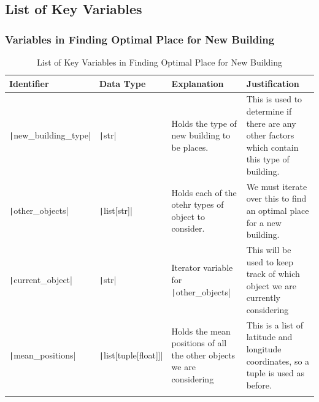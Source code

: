 \documentclass[12pt]{report}
\newcommand{\pil}[1]{\protect\texttt|#1|}
\begin{document}
\subsection{List of Key Variables}
\subsubsection{Variables in Finding Optimal Place for New Building}
\begin{center}
\begin{longtable}{ | m{3cm} | m{4cm}| m{4cm} | m{4cm} |} 
    \hline
    \textbf{Identifier} & \textbf{Data Type} & \textbf{Explanation}  & \textbf{Justification} \\ 
    \hline
    \pil{new_building_type} & \pil{str} & Holds the type of new building to be places. & This is used to determine if there are any other factors which contain this type of building. \\ 
    \hline
    \pil{other_objects} & \pil{list[str]} & Holds each of the otehr types of object to consider. & We must iterate over this to find an optimal place for a new building. \\ 
    \hline
    \pil{current_object} & \pil{str} & Iterator variable for \pil{other_objects} & This will be used to keep track of which object we are currently considering \\ 
    \hline
    \pil{mean_positions} & \pil{list[tuple[float]]} & Holds the mean positions of all the other objects we are considering & This is a list of latitude and longitude coordinates, so a tuple is used as before. \\ 
    \hline
\caption{List of Key Variables in Finding Optimal Place for New Building}
\end{longtable}
\end{center}
\end{document}

